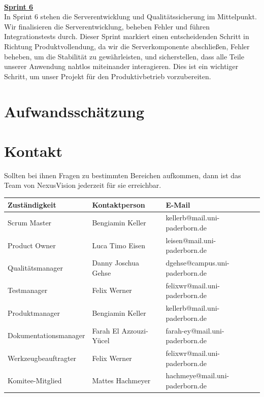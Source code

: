 \documentclass[11pt]{article}
\begin{document}
\\
\textbf{\large{\underline{Sprint 6}}} \\
In Sprint 6 stehen die Serverentwicklung und Qualitätssicherung im Mittelpunkt. Wir finalisieren die Serverentwicklung, beheben Fehler und führen Integrationstests durch. Dieser Sprint markiert einen entscheidenden Schritt in Richtung Produktvollendung, da wir die Serverkomponente abschließen, Fehler beheben, um die Stabilität zu gewährleisten, und sicherstellen, dass alle Teile unserer Anwendung nahtlos miteinander interagieren. Dies ist ein wichtiger Schritt, um unser Projekt für den Produktivbetrieb vorzubereiten.


\section{Aufwandsschätzung}

\newpage
\section{Kontakt}
Sollten bei ihnen Fragen zu bestimmten Bereichen aufkommen, dann ist das Team von NexusVision jederzeit für sie erreichbar.

\begin{center}
    \begin{tabular}[h]{lll}
        \toprule
        \textbf{Zuständigkeit} & \textbf{Kontaktperson} & \textbf{E-Mail} \\
        \midrule
        Scrum Master & Bengiamin Keller & kellerb@mail.uni-paderborn.de \\
        Product Owner & Luca Timo Eisen & leisen@mail.uni-paderborn.de \\
        Qualitätsmanager &  Danny Joschua Gehse & dgehse@campus.uni-paderborn.de\\
        Testmanager & Felix Werner & felixwr@mail.uni-paderborn.de \\  %
        Produktmanager & Bengiamin Keller & kellerb@mail.uni-paderborn.de\\
        Dokumentationsmanager & Farah El Azzouzi-Yücel & farah-ey@mail.uni-paderborn.de\\
        Werkzeugbeauftragter & Felix Werner & felixwr@mail.uni-paderborn.de\\
        Komitee-Mitglied & Mattes Hachmeyer & hachmeye@mail.uni-paderborn.de \\
        \bottomrule
    \end{tabular}
\end{center}



\printindex
\end{document}
